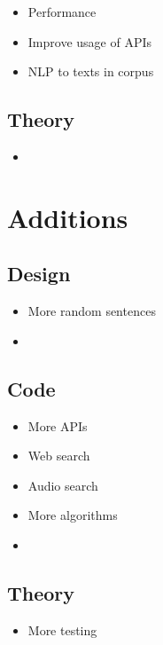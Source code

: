\begin{itemize}
  \item Performance
  \item Improve usage of APIs
  \item NLP to texts in corpus
\end{itemize}

\subsection{Theory}

\begin{itemize}
  \item
\end{itemize}


\section{Additions}

\subsection{Design}

\begin{itemize}
  \item More random sentences
  \item
\end{itemize}

\subsection{Code}

\begin{itemize}
  \item More APIs
  \item Web search
  \item Audio search
  \item More algorithms
  \item
\end{itemize}

\subsection{Theory}

\begin{itemize}
  \item More testing
\end{itemize}


\stopcontents[chapters]

